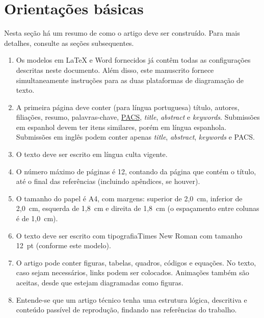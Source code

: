 \documentclass[12pt, a4paper, twoside, twocolumn]{article}
\begin{document}
\section{Orientações básicas}

Nesta seção há um resumo de como o artigo deve ser construído. Para mais detalhes, consulte as seções subsequentes.

\vspace{-8pt}
\begin{enumerate} \itemsep=2pt
    \item Os modelos em LaTeX e Word fornecidos já contêm todas as configurações descritas neste documento. Além disso, este manuscrito fornece simultaneamente instruções para as duas plataformas de diagramação de texto.
	\item A primeira página deve conter (para língua portuguesa) título, autores, filiações, resumo, palavras-chave, \href{https://pubs.aip.org/DocumentLibrary/files/publications/jasa/Acoustics_PACS.pdf}{PACS}, \textit{title}, \textit{abstract} e \textit{keywords}.
	Submissões em espanhol devem ter itens similares, porém em língua espanhola. Submissões em inglês podem conter apenas \textit{title}, \textit{abstract}, \textit{keywords} e PACS.
	\item O texto deve ser escrito em língua culta vigente.
	\item O número máximo de páginas é 12, contando da página que contém o título, até o final das referências (incluindo apêndices, se houver).
	\item O tamanho do papel é A4, com margens: superior de 2,0~cm, inferior de 2,0~cm, esquerda de 1,8~cm e direita de 1,8~cm (o espaçamento entre colunas é de 1,0~cm).
	\item O texto deve ser escrito com tipografia\linebreak Times New Roman com tamanho 12~pt (conforme este modelo).
	\item O artigo pode conter figuras, tabelas, quadros, códigos e equações. No texto, caso sejam necessários, links podem ser colocados. Animações também são aceitas, desde que estejam diagramadas como figuras.
	\item Entende-se que um artigo técnico tenha uma estrutura lógica, descritiva e conteúdo passível de reprodução, findando nas referências do trabalho.
\end{enumerate}
\end{document}
